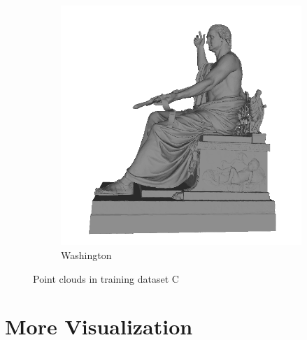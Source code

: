 \begin{figure}
\begin{subfigure}[b]{0.23\linewidth}
	\includegraphics[width=\linewidth]{./Figures/test-dataset/04.washington.png}
	\caption{Washington}
\end{subfigure}
	
	\label{fig:dataset_c}
	\caption{Point clouds in training dataset C}
\end{figure}

\section {More Visualization}


